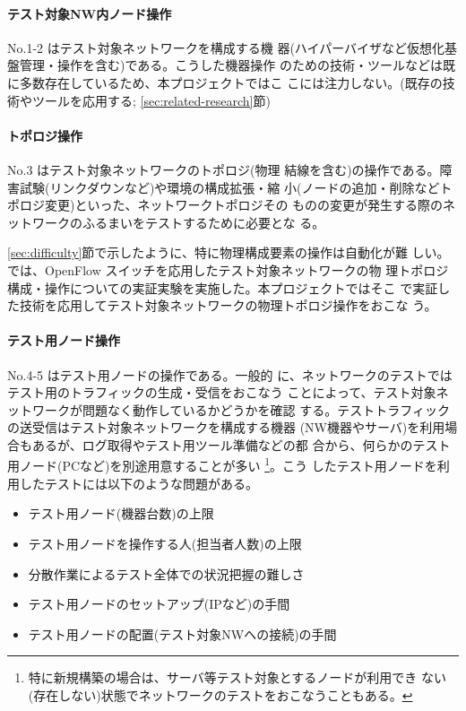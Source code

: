     \paragraph{テスト対象NW内ノード操作}
 No.1-2 はテスト対象ネットワークを構成する機
器(ハイパーバイザなど仮想化基盤管理・操作を含む)である。こうした機器操作
のための技術・ツールなどは既に多数存在しているため、本プロジェクトではこ
こには注力しない。(既存の技術やツールを応用する;
\ref{sec:related-research}節)

    \paragraph{トポロジ操作}
 No.3 はテスト対象ネットワークのトポロジ(物理
結線を含む)の操作である。障害試験(リンクダウンなど)や環境の構成拡張・縮
小(ノードの追加・削除などトポロジ変更)といった、ネットワークトポロジその
ものの変更が発生する際のネットワークのふるまいをテストするために必要とな
る。

\ref{sec:difficulty}節で示したように、特に物理構成要素の操作は自動化が難
しい。\lopj では、OpenFlow スイッチを応用したテスト対象ネットワークの物
理トポロジ構成・操作についての実証実験を実施した。本プロジェクトではそこ
で実証した技術を応用してテスト対象ネットワークの物理トポロジ操作をおこな
う。

    \paragraph{テスト用ノード操作}
 No.4-5 はテスト用ノードの操作である。一般的
に、ネットワークのテストではテスト用のトラフィックの生成・受信をおこなう
ことによって、テスト対象ネットワークが問題なく動作しているかどうかを確認
する。テストトラフィックの送受信はテスト対象ネットワークを構成する機器
(NW機器やサーバ)を利用場合もあるが、ログ取得やテスト用ツール準備などの都
合から、何らかのテスト用ノード(PCなど)を別途用意することが多い
\footnote{特に新規構築の場合は、サーバ等テスト対象とするノードが利用でき
ない(存在しない)状態でネットワークのテストをおこなうこともある。}。こう
したテスト用ノードを利用したテストには以下のような問題がある。
\begin{itemize}
 \item テスト用ノード(機器台数)の上限
 \item テスト用ノードを操作する人(担当者人数)の上限
 \item 分散作業によるテスト全体での状況把握の難しさ
 \item テスト用ノードのセットアップ(IPなど)の手間
 \item テスト用ノードの配置(テスト対象NWへの接続)の手間
\end{itemize}

